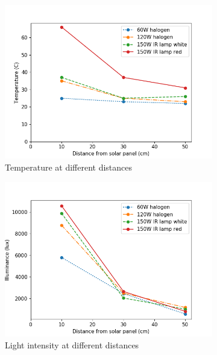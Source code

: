 \begin{figure}
	\centering
	\begin{subfigure}[b]{0.49\textwidth}
		\includegraphics[width=\textwidth]{pics/light_experiment_temp.png}
		\caption{Temperature at different distances}
		\label{fig:light_temp}
	\end{subfigure}
	\begin{subfigure}[b]{0.49\textwidth}
		\includegraphics[width=\textwidth]{pics/light_experiment_lux.png}
		\caption{Light intensity at different distances}
		\label{fig:light_lux}
	\end{subfigure}
	\caption{}
\end{figure}


